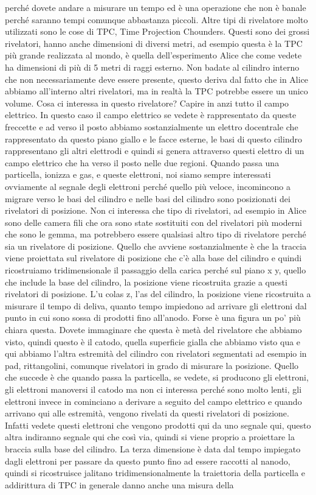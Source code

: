 perché dovete andare a misurare un tempo ed è una operazione che non è banale perché saranno tempi comunque abbastanza piccoli. Altre tipi di rivelatore molto utilizzati sono le cose di TPC, Time Projection Chounders. Questi sono dei grossi rivelatori, hanno anche dimensioni di diversi metri, ad esempio questa è la TPC più grande realizzata al mondo, è quella dell'esperimento Alice che come vedete ha dimensioni di più di 5 metri di raggi esterno. Non badate al cilindro interno che non necessariamente deve essere presente, questo deriva dal fatto che in Alice abbiamo all'interno altri rivelatori, ma in realtà la TPC potrebbe essere un unico volume. Cosa ci interessa in questo rivelatore? Capire in anzi tutto il campo elettrico. In questo caso il campo elettrico se vedete è rappresentato da queste freccette e ad verso il posto abbiamo sostanzialmente un elettro docentrale che rappresentato da questo piano giallo e le facce esterne, le basi di questo cilindro rappresentano gli altri elettrodi e quindi si genera attraverso questi elettro di un campo elettrico che ha verso il posto nelle due regioni. Quando passa una particella, ionizza e gas, e queste elettroni, noi siamo sempre interessati ovviamente al segnale degli elettroni perché quello più veloce, incomincono a migrare verso le basi del cilindro e nelle basi del cilindro sono posizionati dei rivelatori di posizione. Non ci interessa che tipo di rivelatori, ad esempio in Alice sono delle camera fili che ora sono state sostituiti con del rivelatori più moderni che sono le gemma, ma potrebbero essere qualsiasi altro tipo di rivelatore perché sia un rivelatore di posizione. Quello che avviene sostanzialmente è che la traccia viene proiettata sul rivelatore di posizione che c'è alla base del cilindro e quindi ricostruiamo tridimensionale il passaggio della carica perché sul piano x y, quello che include la base del cilindro, la posizione viene ricostruita grazie a questi rivelatori di posizione. L'u colas z, l'as del cilindro, la posizione viene ricostruita a misurare il tempo di deliva, quanto tempo impiedono ad arrivare gli elettroni dal punto in cui sono sossa di prodotti fino all'anodo. Forse è una figura un po' più chiara questa. Dovete immaginare che questa è metà del rivelatore che abbiamo visto, quindi questo è il catodo, quella superficie gialla che abbiamo visto qua e qui abbiamo l'altra estremità del cilindro con rivelatori segmentati ad esempio in pad, rittangolini, comunque rivelatori in grado di misurare la posizione. Quello che succede è che quando passa la particella, se vedete, si producono gli elettroni, gli elettroni manoversi il catodo ma non ci interessa perché sono molto lenti, gli elettroni invece in cominciano a derivare a seguito del campo elettrico e quando arrivano qui alle estremità, vengono rivelati da questi rivelatori di posizione. Infatti vedete questi elettroni che vengono prodotti qui da uno segnale qui, questo altra indiranno segnale qui che così via, quindi si viene proprio a proiettare la braccia sulla base del cilindro. La terza dimensione è data dal tempo impiegato dagli elettroni per passare da questo punto fino ad essere raccotti al nanodo, quindi si ricostruisce jalitano tridimensionalmente la traiettoria della particella e addirittura di TPC in generale danno anche una misura della 